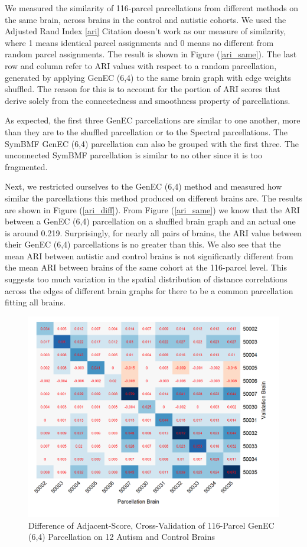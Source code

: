 We measured the similarity of 116-parcel parcellations from different
methods on the same brain, across brains in the control and autistic
cohorts. We used the Adjusted Rand Index \ref{ari} {\color{red}Citation doesn't
work} as our measure of
similarity, where 1 means identical parcel assignments and 0 means no
different from random parcel assignments. The result is shown in Figure
(\ref{ari_same}). The last row and column refer to ARI values with
respect to a random parcellation, generated by applying GenEC (6,4) to
the same brain graph with edge weights shuffled. The reason for this is
to account for the portion of ARI scores that derive solely from the
connectedness and smoothness property of parcellations.

As expected, the first three GenEC parcellations are similar to one
another, more than they are to the shuffled parcellation or to the
Spectral parcellations. The SymBMF GenEC (6,4) parcellation can also be
grouped with the first three. The unconnected SymBMF parcellation is
similar to no other since it is too fragmented.

Next, we restricted ourselves to the GenEC (6,4) method and measured
how similar the parcellations this method produced on different brains
are. The results are shown in Figure (\ref{ari_diff}). From Figure
(\ref{ari_same}) we know that the ARI between a GenEC (6,4) parcellation
on a shuffled brain graph and an actual one is around 0.219.
Surprisingly, for nearly all pairs of brains, the ARI value between
their GenEC (6,4) parcellations is no greater than this. We also see
that the mean ARI between autistic and control brains is not
significantly different from the mean ARI between brains of the same
cohort at the 116-parcel level. This suggests too much variation in the
spatial distribution of distance correlations across the edges of
different brain graphs for there to be a common parcellation fitting
all brains.

\begin{figure}
\caption{Difference of Adjacent-Score, Cross-Validation of 116-Parcel
GenEC (6,4) Parcellation on 12 Autism and Control Brains}
\label{cv_ec}
\includegraphics[scale = 1]{figs/8_cv_ec.png}
\end{figure}

